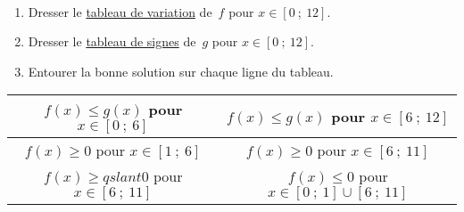 \exercice~\\

\noindent 
\begin{minipage}{0.50\linewidth}
	
\end{minipage}
\begin{minipage}{0.50\linewidth}
\begin{enumerate}
	\item Dresser le \underline{tableau de variation} de~$f$ pour \mbox{$x \in [0~;~12]$}.\\
	\item Dresser le \underline{tableau de signes} de~$g$ pour \mbox{$x \in [0~;~12]$}.\\
	\item Entourer la bonne solution sur chaque ligne du tableau.
\end{enumerate}
\end{minipage}

\begin{center}
\begin{tabular}{|c|c|}
\hline 
\rule[-1ex]{0pt}{2.5ex} $f(x) \leqslant g(x)$ pour $x \in [0~;~6]$ & $f(x) \leqslant g(x)$ pour $x \in [6~;~12]$ \\ 
\hline 
\rule[-1ex]{0pt}{2.5ex} $f(x) \geqslant 0$ pour $x \in [1~;~6]$ & $f(x) \geqslant 0$ pour $x \in [6~;~11]$ \\ 
\hline 
\rule[-1ex]{0pt}{2.5ex} $f(x) \ge	qslant 0$ pour $x \in [6~;~11]$ & $f(x) \leqslant 0$ pour $x \in [0~;~1] \cup [6~;~11]$ \\ 
\hline 
\end{tabular} 
\end{center}